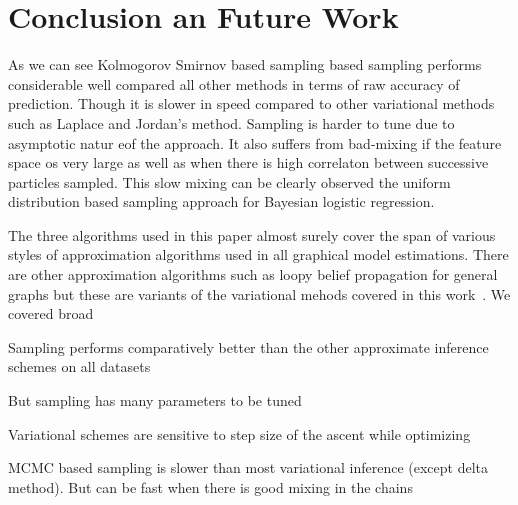 
\section{Conclusion an Future Work}
As we can see Kolmogorov Smirnov based sampling based sampling performs
considerable well compared all other methods in terms of raw accuracy of
prediction. Though it is slower in speed compared to other variational methods
such as Laplace and Jordan's method. Sampling is harder to tune due to
asymptotic natur eof the approach. It also suffers from bad-mixing if the
feature space os very large as well as when there is high correlaton between
successive particles sampled. This slow mixing can be clearly observed the
uniform distribution based sampling approach for Bayesian logistic regression. 

The three algorithms used in this paper almost surely cover the
span of various styles of approximation algorithms used in all graphical model
estimations. There are other approximation algorithms such as loopy belief
propagation for general graphs but these are variants of the variational mehods
covered in this work~\cite{Heskes02}. We covered broad 

Sampling performs
comparatively better than the other approximate inference schemes on all datasets

    But sampling has many parameters to be tuned

    Variational schemes are sensitive to step size of the ascent while optimizing

    MCMC based sampling is slower than most variational inference (except delta method).
    But can be fast when there is good mixing in the chains